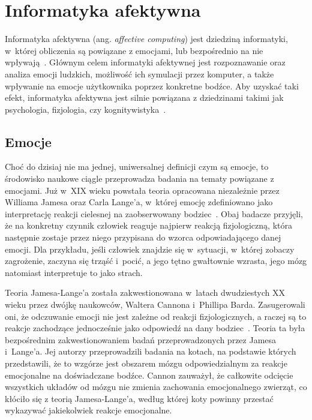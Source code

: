 \chapter{Informatyka afektywna}
\label{cha:affectiveComputing}

Informatyka afektywna (ang. \textit{affective computing}) jest dziedziną informatyki, w~której obliczenia są powiązane z emocjami, lub bezpośrednio na nie wpływają~\cite{Picard:1997:AC:265013}. Głównym celem informatyki afektywnej jest rozpoznawanie oraz analiza emocji ludzkich, możliwość ich symulacji przez komputer, a także wpływanie na emocje użytkownika poprzez konkretne bodźce. Aby uzyskać taki efekt, informatyka afektywna jest silnie powiązana z dziedzinami takimi jak psychologia, fizjologia, czy kognitywistyka~\cite{affective_computing_review_tao_tieniu}.

\section{Emocje}
Choć do dzisiaj nie ma jednej, uniwersalnej definicji czym są emocje, to środowisko naukowe ciągle przeprowadza badania na tematy powiązane z emocjami. Już w~XIX wieku powstała teoria opracowana niezależnie przez Williama Jamesa oraz Carla Lange'a, w~której emocję zdefiniowano jako interpretację reakcji cielesnej na zaobserwowany bodziec~\cite{Coleman2011}. Obaj badacze przyjęli, że na konkretny czynnik człowiek reaguje najpierw reakcją fizjologiczną, która następnie zostaje przez niego przypisana do wzorca odpowiadającego danej emocji. Dla przykładu, jeśli człowiek znajdzie się w~sytuacji, w~której zobaczy zagrożenie, zaczyna się trząść i~pocić, a jego tętno gwałtownie wzrasta, jego mózg natomiast interpretuje to jako strach.

Teoria Jamesa-Lange'a została zakwestionowana w~latach dwudziestych XX wieku przez dwójkę naukowców, Waltera Cannona i~Phillipa Barda. Zasugerowali oni, że odczuwanie emocji nie jest zależne od reakcji fizjologicznych, a raczej są to reakcje zachodzące jednocześnie jako odpowiedź na dany bodziec~\cite{cannon_1927}. Teoria ta była bezpośrednim zakwestionowaniem badań przeprowadzonych przez Jamesa i~Lange'a. Jej autorzy przeprowadzili badania na kotach, na podstawie których przedstawili, że to wzgórze jest obszarem mózgu odpowiedzialnym za reakcje emocjonalne na doświadczane bodźce. Cannon zauważył, że całkowite odcięcie wszystkich układów od mózgu nie zmienia zachowania emocjonalnego zwierząt, co kłóciło się z teorią Jamesa-Lange'a, według której koty powinny przestać wykazywać jakiekolwiek reakcje emocjonalne.

